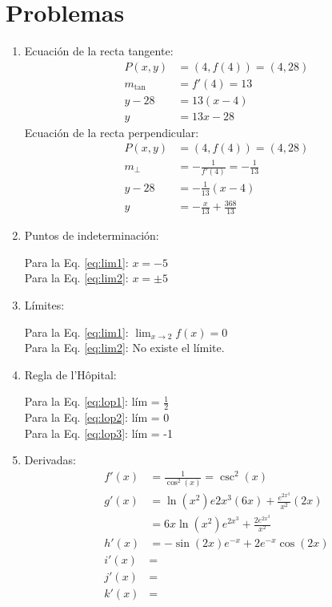 \documentclass{article}
\begin{document}
\section{Problemas} %
\label{sec:resproblemas}
\begin{enumerate}

\item Ecuación de la recta tangente:
\begin{align*}
P(x,y) &= (4,f(4)) = (4,28) \\
m_{\tan} &= f'(4) = 13 \\
y - 28 &= 13(x-4) \\
y &= 13x -28
\end{align*}
Ecuación de la recta perpendicular:
\begin{align*}
P(x,y) &= (4,f(4)) = (4,28) \\
m_{\perp} &=- \frac{1}{f'(4)} =-\frac{1}{13} \\
y - 28 &= -\frac{1}{13}(x-4) \\
y &= - \frac{x}{13} + \frac{368}{13}
\end{align*}

\item Puntos de indeterminación: 

Para la Eq. \eqref{eq:lim1}: $x=-5$ \\
Para la Eq. \eqref{eq:lim2}: $x = \pm 5$

\item Límites: 

Para la Eq. \eqref{eq:lim1}: $\lim_{x \rightarrow 2}f(x) = 0$ \\
Para la Eq. \eqref{eq:lim2}: No existe el límite.

\item Regla de l'H\^opital:

Para la Eq. \eqref{eq:lop1}: lím = $\frac{1}{2}$  \\
Para la Eq. \eqref{eq:lop2}: lím = 0  \\
Para la Eq. \eqref{eq:lop3}: lím = -1 

\item Derivadas:
\begin{align}
f'(x) &= \frac{1}{\cos^2(x)} = \csc^{2}(x) \\
g'(x) &= \ln(x^{2})e{2x^{3}}(6x) + \frac{e^{2x^{3}}}{x^2}(2x) \\
      &= 6x \ln(x^{2})e^{2x^{3}} + \frac{2e^{2x^3}}{x^2}  \\
h'(x) &= - \sin(2x)e^{-x} + 2e^{-x} \cos{(2x)}  \\
i'(x) &=   \\
j'(x) &=   \\
k'(x) &= 
\end{align}



\end{enumerate}
\end{document}
